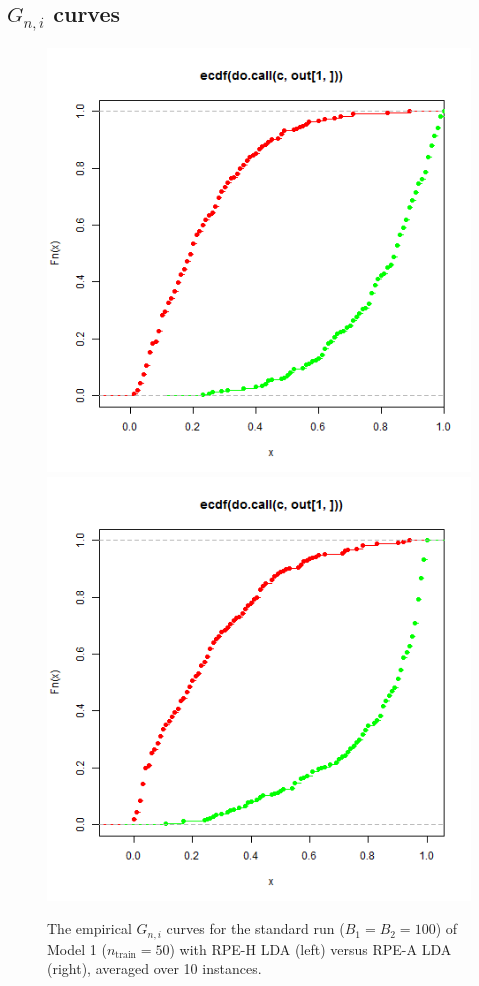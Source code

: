 \documentclass[ejs,preprint]{imsart}
\begin{document}
\subsection{$G_{n,i}$ curves}

\begin{figure}
\begin{centering}
\includegraphics[scale=0.35]{G_ni}\includegraphics[scale=0.35]{G_ni_axis}
\par\end{centering}

\caption{The empirical $G_{n,i}$ curves for the standard run ($B_{1}=B_{2}=100$)
of Model 1 ($n_{\mathrm{train}}=50$) with RPE-H LDA (left) versus
RPE-A LDA (right), averaged over 10 instances.}

\label{fig:std-run-g-curves}
\end{figure}
\end{document}
